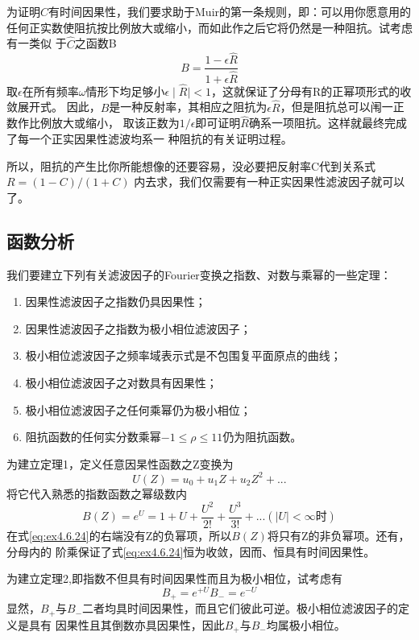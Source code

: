 为证明$\hat{C}$有时间因果性，我们要求助于Muir的第一条规则，即：可以用你愿意用的
任何正实数使阻抗按比例放大或缩小，而如此作之后它将仍然是一种阻抗。试考虑有一类似
于$\hat{C}$之函数B
\begin{equation}
B=\frac{1-\epsilon \hat{R}}{1+\epsilon \hat{R}}
\label{eq:ex4.6.22}
\end{equation}
取$\epsilon$在所有频率$\omega$情形下均足够小$\epsilon\mid\hat{R}\mid<1$，这就保证了分母有R的正幂项形式的收敛展开式。
因此，$B$是一种反射率，其相应之阻抗为$\epsilon\hat{R}$，但是阻抗总可以闱一正数作比例放大或缩小，
取该正数为$1/\epsilon$即可证明$\hat{R}$确系一项阻抗。这样就最终完成了每一个正实因果性滤波均系一
种阻抗的有关证明过程。

所以，阻抗的产生比你所能想像的还要容易，没必要把反射率C代到关系式$
R=(1-C)/(1+C)$
内去求，我们仅需要有一种正实因果性滤波因子就可以了。

\subsection{函数分析}
\label{sec:4.6.7}

我们要建立下列有关滤波因子的Fourier变换之指数、对数与乘幂的一些定理：
\begin{enumerate}
\item 因果性滤波因子之指数仍具因果性；
\item 因果性滤波因子之指数为极小相位滤波因子；
\item 极小相位滤波因子之频率域表示式是不包围复平面原点的曲线；
\item 极小相位滤波因子之对数具有因果性；
\item 极小相位滤波因子之任何乘幂仍为极小相位；
\item 阻抗函数的任何实分数乘幂$-1\leq \rho\le1 1$仍为阻抗函数。
\end{enumerate}
为建立定理1，定义任意因杲性函数之Z变换为
\begin{equation}
U(Z)=u_0+u_1Z+u_2Z^2+...
\label{eq:ex4.6.23}
\end{equation}
将它代入熟悉的指数函数之幂级数内
\begin{equation}
B(Z)=e^{U}=1+U+\frac{U^2}{2!}+\frac{U^3}{3!} +...(\mid U\mid < \infty \text{时})
\label{eq:ex4.6.24}
\end{equation}
在式\ref{eq:ex4.6.24}的右端没有Z的负幂项，所以$B(Z)$将只有Z的非负幂项。还有，分母内的
阶乘保证了式\ref{eq:ex4.6.24}恒为收敛，因而、恒具有时间因果性。

为建立定理2,即指数不但具有时间因果性而且为极小相位，试考虑有
\begin{subequations}
\begin{equation}
B_+=e^{+U}
\label{eq:ex4.6.25a}
\end{equation}
\begin{equation}
B_-=e^{-U}
\label{eq:ex4.6.25b}
\end{equation}
\label{eq:ex4.6.25}
\end{subequations}
显然，$B_+$与$B_-$二者均具时间因果性，而且它们彼此可逆。极小相位滤波因子的定义是具有
因果性且其倒数亦具因果性，因此$B_+$与$B_-$均属极小相位。

